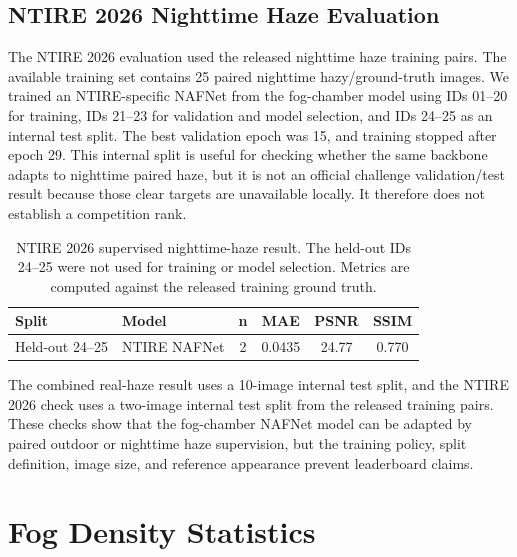 \documentclass[9pt]{osa-supplemental-document}
\begin{document}
 

\subsection{NTIRE 2026 Nighttime Haze Evaluation}

The NTIRE 2026 evaluation used the released nighttime haze training pairs. The available training set contains 25 paired nighttime hazy/ground-truth images. We trained an NTIRE-specific NAFNet from the fog-chamber model using IDs 01--20 for training, IDs 21--23 for validation and model selection, and IDs 24--25 as an internal test split. The best validation epoch was 15, and training stopped after epoch 29. This internal split is useful for checking whether the same backbone adapts to nighttime paired haze, but it is not an official challenge validation/test result because those clear targets are unavailable locally. It therefore does not establish a competition rank.

\begin{table}[H]
\centering
\small
\caption{NTIRE 2026 supervised nighttime-haze result. The held-out IDs 24--25 were not used for training or model selection. Metrics are computed against the released training ground truth.}
\label{tabS:ntire26_supervised}
\begin{tabular}{llcccc}
\toprule
\textbf{Split} & \textbf{Model} & \textbf{n} & \textbf{MAE} & \textbf{PSNR} & \textbf{SSIM} \\
\midrule
Held-out 24--25 & NTIRE NAFNet & 2 & 0.0435 & 24.77 & 0.770 \\
\bottomrule
\end{tabular}
\end{table}
\FloatBarrier

The combined real-haze result uses a 10-image internal test split, and the NTIRE 2026 check uses a two-image internal test split from the released training pairs. These checks show that the fog-chamber NAFNet model can be adapted by paired outdoor or nighttime haze supervision, but the training policy, split definition, image size, and reference appearance prevent leaderboard claims.
\FloatBarrier


\section{Fog Density Statistics}
\end{document}

